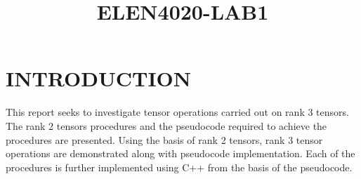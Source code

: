 
\usepackage{float}




\title{\centering \textbf{{ELEN4020-LAB1}}}

\author{}


% 



\maketitle
\thispagestyle{empty}\pagestyle{empty}

%

\section{INTRODUCTION} 
This report seeks to investigate tensor operations carried out on rank 3 tensors. The rank 2 tensors procedures and the pseudocode required to achieve the procedures are presented. Using the basis of rank 2 tensors, rank 3 tensor operations are demonstrated along with pseudocode implementation. Each of the procedures is further implemented using C++ from the basis of the pseudocode.  
